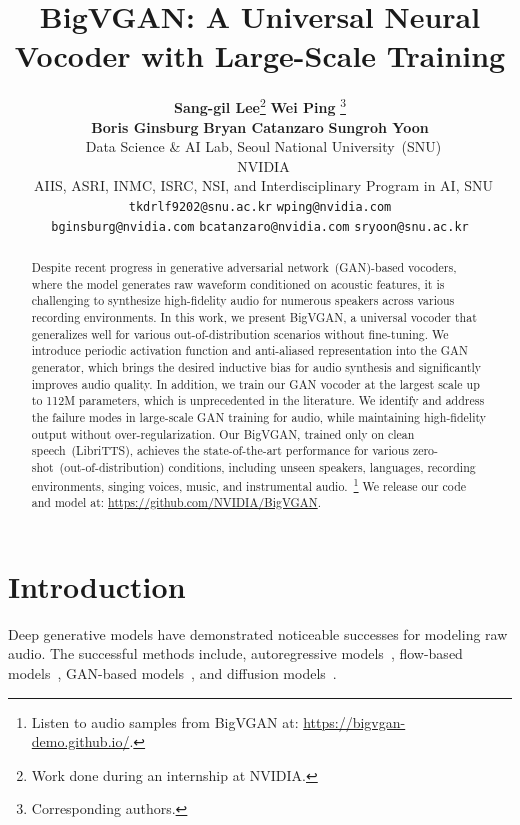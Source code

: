 \documentclass{article} \usepackage{iclr2023_conference,times}
\title{BigVGAN: A Universal Neural Vocoder with Large-Scale Training}
\author{
\textbf{\hspace{-.1cm}Sang-gil Lee}\thanks{Work done during an internship at NVIDIA.}
\hspace{2.0em}
\textbf{Wei Ping} \thanks{Corresponding authors.}
\vspace{.1cm}
\hspace{1em} \\
\textbf{\hspace{-.25mm}Boris Ginsburg}
\hspace{.8em}
\textbf{Bryan Catanzaro}
\hspace{.8em}
\textbf{Sungroh Yoon} \vspace{2mm}\\
~Data Science \& AI Lab, Seoul National University~(SNU) \vspace{.5mm} \\
~NVIDIA \vspace{.5mm}\\
~AIIS, ASRI, INMC, ISRC, NSI, and Interdisciplinary Program in AI, SNU \vspace{2mm} \\
\texttt{tkdrlf9202@snu.ac.kr} \hspace{0.5em} \texttt{wping@nvidia.com} 
\\
\texttt{bginsburg@nvidia.com}  \hspace{0.5em}
 \texttt{bcatanzaro@nvidia.com} \hspace{0.5em} \texttt{sryoon@snu.ac.kr} \\
}
\theoremstyle{plain}
\theoremstyle{definition}
\theoremstyle{remark}
\begin{document}
\maketitle

\begin{abstract}
Despite recent progress in generative adversarial network~(GAN)-based vocoders, where the model generates raw waveform conditioned on acoustic features, it is challenging to synthesize high-fidelity audio for numerous speakers across various recording environments.  
In this work, we present BigVGAN, a universal vocoder that generalizes well for various out-of-distribution scenarios without fine-tuning.
We introduce periodic activation function and anti-aliased representation into the GAN generator, which brings the desired inductive bias for audio synthesis and significantly improves audio quality.
In addition, we train our GAN vocoder at the largest scale up to 112M parameters, which is unprecedented in the literature. We identify and address the failure modes in large-scale GAN training for audio, while maintaining high-fidelity output without over-regularization. 
Our BigVGAN, trained only on clean speech~(LibriTTS), achieves the state-of-the-art performance for various zero-shot~(out-of-distribution) conditions, including unseen speakers, languages, recording environments, singing voices, music,  and instrumental audio.~\footnote{Listen to audio samples from BigVGAN at: {\url{https://bigvgan-demo.github.io/}}. }
We release our code and model at:  {\small \url{https://github.com/NVIDIA/BigVGAN}}.
\end{abstract}


\vspace{-.2cm}
\section{Introduction}
\label{sec:intro}
\vspace{-.1cm}
Deep generative models have demonstrated noticeable successes for modeling raw audio.
The successful methods include, autoregressive models~\citep{oord2016wavenet, mehri2016samplernn, kalchbrenner2018efficient}, flow-based models~\citep{oord2017parallel,ping2018clarinet, prenger2019waveglow, kim2018flowavenet, ping2019waveflow, lee2020nanoflow}, GAN-based models~\citep{donahue2018adversarial, kumar2019melgan,binkowski2020high, yamamoto2020parallel, kong2020hifi}, and diffusion models~\citep{kong2020diffwave, chen2020wavegrad, lee2022priorgrad}.
\end{document}
